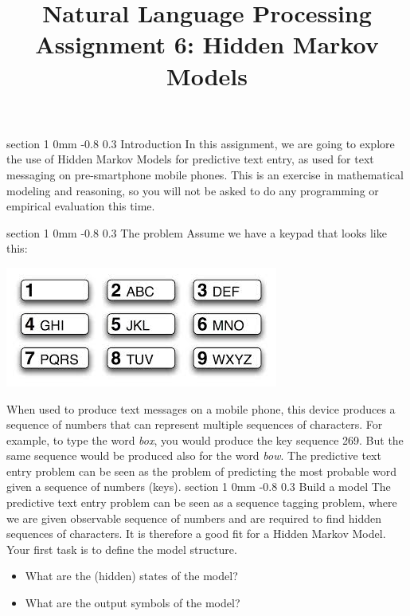 \documentclass[11pt]{article}
\title{{\LARGE Natural Language Processing}\\[1.5mm]{\large Assignment 6: Hidden Markov Models}}
\author{}
\date{} %
\makeatletter
\newcommand{\newsec}[2]{\section{#1}\label{sec:#2}\noindent}
\renewcommand{\section}{\@startsection
{section}%
{1}%
{0mm}%
{-0.8\baselineskip}%
{0.3\baselineskip}%
{\bfseries\large}}%
\makeatother
\begin{document}
 

\maketitle
\vspace{-2mm}
\newsec{Introduction}{intro}%
In this assignment, we are going to explore the use of Hidden Markov Models for predictive text entry, as used for text messaging on pre-smartphone mobile phones.
This is an exercise in mathematical modeling and reasoning, so you will not be asked to do any programming or empirical evaluation this time.

\newsec{The problem}{problem}%
Assume we have a keypad that looks like this:
\begin{center}
\includegraphics[scale=0.5]{pics/keypad.jpeg}
\end{center}
When used to produce text messages on a mobile phone, this device produces a sequence of numbers that can represent multiple sequences of characters. 
For example, to type the word {\em box}, you would produce the key sequence 269. But the same sequence would be produced also for the word {\em bow}. 
The predictive text entry problem can be seen as the problem of predicting the most probable word given a sequence of numbers (keys).
\newsec{Build a model}{model}%
The predictive text entry problem can be seen as a sequence tagging problem, where we are given observable sequence of numbers and are required to
find hidden sequences of characters. It is therefore a good fit for a Hidden Markov Model. Your first task is to define the model structure.
\begin{itemize}[noitemsep,topsep=0.2cm]
\item What are the (hidden) states of the model?
\item What are the output symbols of the model?
\end{itemize}
\end{document}
